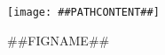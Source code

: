 
\begin{figure}[h]
\caption{##FIGNAME##}
\centering
\texttt{[image: \#\#PATHCONTENT\#\#]}
\end{figure}


